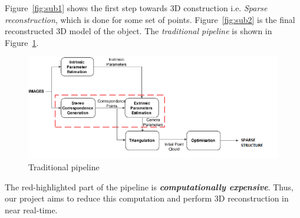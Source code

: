\documentclass{article}
\begin{document}
		Figure~\ref{fig:sub1} shows the first step towards 3D construction i.e. \textit{Sparse reconstruction}, which is done for some set of points. Figure~\ref{fig:sub2} is the final reconstructed 3D model of the object. The \textit{traditional pipeline} is shown in Figure~\ref{fig3}.

		\begin{figure}[ht!]
		\centering
		\includegraphics[width=14cm]{traditional_pipeline2.png}
		\caption{Traditional pipeline\label{fig3}}
		\end{figure}

		The red-highlighted part of the pipeline is \textit{\textbf{computationally expensive}}. Thus, our project aims to reduce this computation and perform 3D reconstruction in near real-time.
\end{document}
